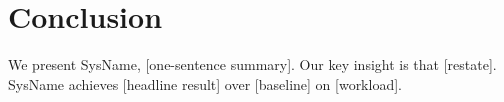 \documentclass[sigplan,nonacm]{acmart}
\newcommand{\sysname}{SysName\xspace}   %
\begin{document}
\section{Conclusion}
\label{sec:conclusion}

We present \sysname, [one-sentence summary]. Our key insight is that [restate].
\sysname achieves [headline result] over [baseline] on [workload].





\end{document}
